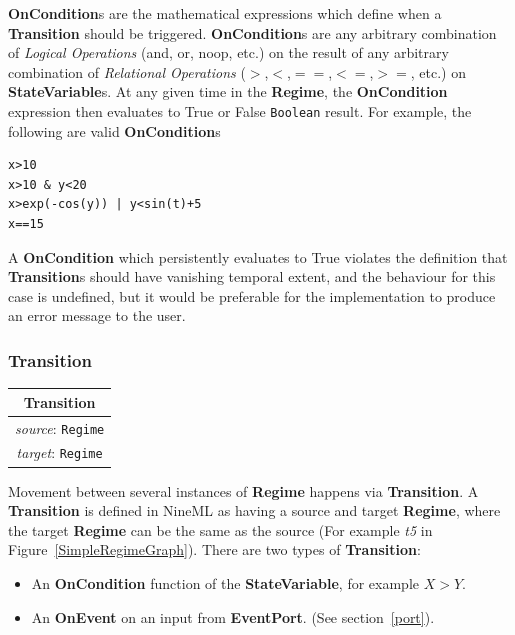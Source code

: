 \documentclass{article}
\newcommand{\nmlClass}[1]{{\bf #1}}
\newcommand{\StateVariable}{{\bf{StateVariable}}\xspace}
\newcommand{\EventPort}{{\bf{EventPort}}\xspace}
\newcommand{\Regime}{{\bf{Regime}}\xspace}
\newcommand{\Transition}{{\bf{Transition}}\xspace}
\newcommand{\OnEvent}{{\bf{OnEvent}}\xspace}
\newcommand{\OnCondition}{{\bf{OnCondition}}\xspace}
\begin{document}
\nmlClass{OnCondition}s are the mathematical expressions which define
when a \nmlClass{Transition} should be triggered.
\nmlClass{OnCondition}s are any arbitrary combination of \emph{Logical
Operations} (and, or, noop, etc.) on the
result of any arbitrary combination of \emph{Relational Operations}
($>$,$<$,$==$,$<=$,$>=$, etc.) on
\nmlClass{StateVariable}s. At any given time in the \nmlClass{Regime},
the \nmlClass{OnCondition} expression then evaluates to True or False
{\tt Boolean} result. For example, the following are valid
\nmlClass{OnCondition}s

\begin{verbatim}
x>10
x>10 & y<20
x>exp(-cos(y)) | y<sin(t)+5
x==15
\end{verbatim}

A \nmlClass{OnCondition} which persistently evaluates to True violates
the definition that \nmlClass{Transition}s should have vanishing
temporal extent, and the behaviour for this case is undefined, but it
would be preferable for the implementation to produce an error message
to the user.

\subsubsection{Transition}
\label{transition}

\begin{table}[htb]
\center
\begin{tabular}{|c|}
\hline
\hline
Transition \\
\hline
\hline
{\em source}: {\tt Regime} \\
\hline
{\em target}: {\tt Regime} \\
\hline
\end{tabular}
\end{table}

Movement between several instances of \Regime happens via \Transition.
A \nmlClass{Transition} is defined in NineML as having
a source and target \nmlClass{Regime}, where the target
\nmlClass{Regime} can be the same as the source (For example \emph{t5}
in Figure~\ref{SimpleRegimeGraph}). There are two types of \Transition:

\begin{itemize}
\item An \OnCondition function of the \StateVariable, for
example $X > Y$.
\item An \OnEvent on an input from \EventPort. (See section~\ref{port}).
\end{itemize}
\end{document}
